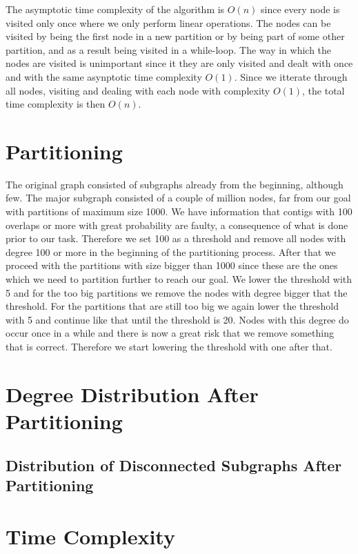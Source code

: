 \documentclass[a4paper,10pt]{article}
\begin{document}
The asymptotic time complexity of the algorithm is $O(n)$ since every node is visited only once where we only perform linear operations. The nodes can be visited by being the first node in a new partition or by being part of
some other partition, and as a result being visited in a while-loop. The way in which the nodes are visited is unimportant since it they are only visited and dealt with once and with the same asynptotic time complexity $O(1)$. 
Since we itterate through all nodes, visiting and dealing with each node with complexity $O(1)$, the total time complexity is then $O(n)$.

\section{Partitioning}


The original graph consisted of subgraphs already from the beginning, although few. The major subgraph consisted of a couple of million
nodes, far from our goal with partitions of maximum size 1000. We have information that contigs with 100 overlaps or more with great
probability are faulty, a consequence of what is done prior to our task. Therefore we set 100 as a threshold and remove all nodes with
degree 100 or more in the beginning of the partitioning process. After that we proceed with the partitions with size bigger than 1000
since these are the ones which we need to partition further to reach our goal. We lower the threshold with 5 and for the too big
partitions we remove the nodes with degree bigger that the threshold. For the partitions that are still too big we again lower the
threshold with 5 and continue like that until the threshold is 20. Nodes with this degree do occur once in a while and there is now a
great risk that we remove something that is correct. Therefore we start lowering the threshold with one after that.



\section{Degree Distribution After Partitioning}


\subsection{Distribution of Disconnected Subgraphs After Partitioning}


\section{Time Complexity}
\end{document}
